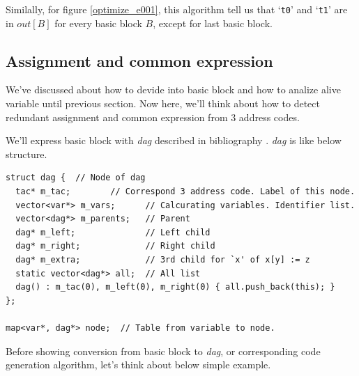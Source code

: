 \vspace{0.5cm}

Similally, for figure \ref{optimize_e001},
this algorithm tell us that
`{\tt{t0}}' and `{\tt{t1}}'
are in $out[B]$ for every basic block $B$, except for last basic block.

\subsection{Assignment and common expression}
\label{optimize_e_assign}
We've discussed about how to devide into basic block
and how to analize alive variable until previous section. Now here, 
we'll think about how to detect redundant assignment and common
expression from 3 address codes.

We'll express basic block with {\em dag} described in bibliography
 \cite{doragon}. {\em dag} is like below structure.

\begin{verbatim}
struct dag {  // Node of dag
  tac* m_tac;        // Correspond 3 address code. Label of this node.
  vector<var*> m_vars;      // Calcurating variables. Identifier list.
  vector<dag*> m_parents;   // Parent
  dag* m_left;              // Left child
  dag* m_right;             // Right child
  dag* m_extra;             // 3rd child for `x' of x[y] := z
  static vector<dag*> all;  // All list
  dag() : m_tac(0), m_left(0), m_right(0) { all.push_back(this); }
};

map<var*, dag*> node;  // Table from variable to node.
\end{verbatim}

Before showing conversion from basic block to {\em dag},
or corresponding code generation algorithm,
let's think about below simple example.

